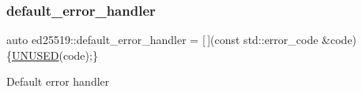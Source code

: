 \subsubsection{\texorpdfstring{default\_error\_handler}{default\_error\_handler}}
{\footnotesize\ttfamily auto ed25519\+::default\+\_\+error\+\_\+handler = \mbox{[}$\,$\mbox{]}(const std\+::error\+\_\+code \&code) \{\mbox{\hyperlink{ed25519_8hpp_a86d500a34c624c2cae56bc25a31b12f3}{U\+N\+U\+S\+ED}}(code);\}\hspace{0.3cm}{\ttfamily [static]}}

Default error handler 